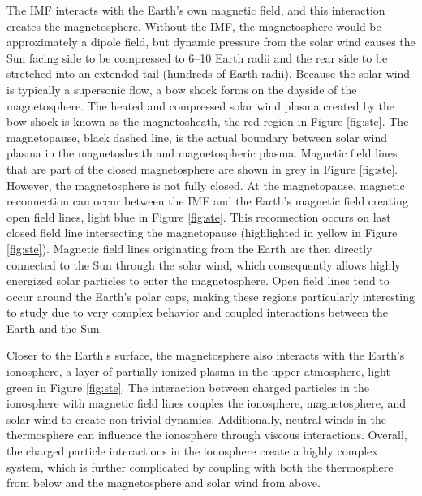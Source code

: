 The IMF interacts with the Earth's own magnetic field, and this interaction creates the magnetosphere.  Without the IMF, the magnetosphere would be approximately a dipole field, but dynamic pressure from the solar wind causes the Sun facing side to be compressed to 6--10 Earth radii and the rear side to be stretched into an extended tail (hundreds of Earth radii).  Because the solar wind is typically a supersonic flow, a bow shock forms on the dayside of the magnetosphere.  The heated and compressed solar wind plasma created by the bow shock is known as the magnetosheath, the red region in Figure \ref{fig:ste}.  The magnetopause, black dashed line, is the actual boundary between solar wind plasma in the magnetosheath and magnetospheric plasma.  Magnetic field lines that are part of the closed magnetosphere are shown in grey in Figure \ref{fig:ste}.  However, the magnetosphere is not fully closed.  At the magnetopause, magnetic reconnection can occur between the IMF and the Earth's magnetic field creating open field lines, light blue in Figure \ref{fig:ste}.  This reconnection occurs on last closed field line intersecting the magnetopause (highlighted in yellow in Figure \ref{fig:ste}).  Magnetic field lines originating from the Earth are then directly connected to the Sun through the solar wind, which consequently allows highly energized solar particles to enter the magnetosphere.  Open field lines tend to occur around the Earth's polar caps, making these regions particularly interesting to study due to very complex behavior and coupled interactions between the Earth and the Sun.

Closer to the Earth's surface, the magnetosphere also interacts with the Earth's ionosphere, a layer of partially ionized plasma in the upper atmosphere, light green in Figure \ref{fig:ste}.  The interaction between charged particles in the ionosphere with magnetic field lines couples the ionosphere, magnetosphere, and solar wind to create non-trivial dynamics.  Additionally,  neutral winds in the thermosphere can influence the ionosphere through viscous interactions.  Overall, the charged particle interactions in the ionosphere create a highly complex system, which is further complicated by coupling with both the thermosphere from below and the magnetosphere and solar wind from above.  

